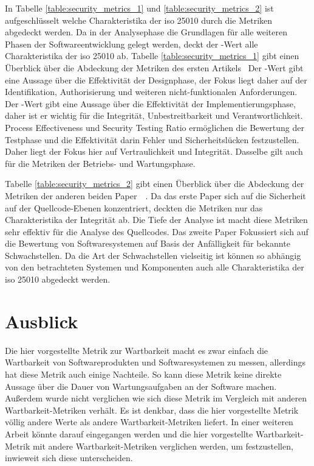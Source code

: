 \documentclass[12pt, a4paper, ngerman]{article}
\begin{document}
In Tabelle \ref{table:security_metrics_1} und \ref{table:security_metrics_2} ist aufgeschlüsselt welche Charakteristika der \ac{iso} 25010 durch die Metriken abgedeckt werden.
Da in der Analysephase die Grundlagen für alle weiteren Phasen der Softwareentwicklung gelegt werden, 
deckt der \alpha-Wert alle Charakteristika der \ac{iso} 25010 ab.
Tabelle \ref{table:security_metrics_1} gibt einen Überblick über die Abdeckung der Metriken des ersten Artikels~\cite{Jain2014SecurityMA}
Der \beta-Wert gibt eine Aussage über die Effektivität der Designphase, 
der Fokus liegt daher auf der Identifikation, Authorisierung und weiteren nicht-funktionalen Anforderungen.
Der \gamma-Wert gibt eine Aussage über die Effektivität der Implementierungsphase, daher ist er wichtig für die Integrität, Unbestreitbarkeit und Verantwortlichkeit.
Process Effectiveness und Security Testing Ratio ermöglichen die Bewertung der Testphase und 
die Effektivität darin Fehler und Sicherheitslücken festzustellen. 
Daher liegt der Fokus hier auf Vertraulichkeit und Integrität.
Dasselbe gilt auch für die Metriken der Betriebs- und Wartungsphase.

Tabelle \ref{table:security_metrics_2} gibt einen Überblick über die Abdeckung der Metriken der anderen beiden Paper~\cite{Chowdhury_Chan_Zulkernine_2008}~\cite{Wang_Wang_Guo_Xia_2009}.
Da das erste Paper sich auf die Sicherheit auf der Quellcode-Ebenen konzentriert, deckten die Metriken nur das Charakteristika der Integrität ab.
Die Tiefe der Analyse ist macht diese Metriken sehr effektiv für die Analyse des Quellcodes.
Das zweite Paper Fokussiert sich auf die Bewertung von Softwaresystemen auf Basis der Anfälligkeit für bekannte Schwachstellen.
Da die Art der Schwachstellen vielseitig ist können so abhängig von den betrachteten Systemen und Komponenten auch alle Charakteristika der \ac{iso} 25010 abgedeckt werden.

\section{Ausblick}

Die hier vorgestellte Metrik zur Wartbarkeit macht es zwar einfach
die Wartbarkeit von Softwareprodukten und Softwaresystemen
zu messen, allerdings hat diese Metrik auch einige Nachteile.
So kann diese Metrik keine direkte Aussage über die Dauer 
von Wartungsaufgaben an der Software machen.
Außerdem wurde nicht verglichen wie sich diese Metrik 
im Vergleich mit anderen Wartbarkeit-Metriken verhält.
Es ist denkbar, dass die hier vorgestellte Metrik
völlig andere Werte als andere Wartbarkeit-Metriken liefert.
In einer weiteren Arbeit könnte darauf eingegangen werden
und die hier vorgestellte Wartbarkeit-Metrik
mit andere Wartbarkeit-Metriken verglichen werden,
um festzustellen, inwieweit sich diese unterscheiden.
\end{document}
